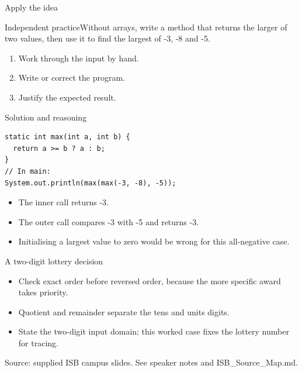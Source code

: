 \documentclass[10pt,aspectratio=169]{beamer}
\begin{document}
\begin{frame}[fragile,t]{Apply the idea}
\begin{alertblock}{Independent practice}Without arrays, write a method that returns the larger of two values, then use it to find the largest of -3, -8 and -5.\end{alertblock}\vspace{3mm}\begin{enumerate}\item Work through the input by hand.\item Write or correct the program.\item Justify the expected result.\end{enumerate}
\end{frame}

\begin{frame}[fragile,t]{Solution and reasoning}
\begin{lstlisting}
static int max(int a, int b) {
  return a >= b ? a : b;
}
// In main:
System.out.println(max(max(-3, -8), -5));
\end{lstlisting}\vspace{1mm}\small\begin{itemize}
\item The inner call returns -3.
\item The outer call compares -3 with -5 and returns -3.
\item Initialising a largest value to zero would be wrong for this all-negative case.
\end{itemize}
\end{frame}

\begin{frame}[fragile,t]{A two{-}digit lottery decision}
\begin{itemize}
\item Check exact order before reversed order, because the more specific award takes priority.
\item Quotient and remainder separate the tens and units digits.
\item State the two{-}digit input domain; this worked case fixes the lottery number for tracing.
\end{itemize}
\vspace{3mm}\footnotesize\textcolor{accent}{Source: supplied ISB campus slides. See speaker notes and ISB\_Source\_Map.md.}
\end{frame}
\end{document}

